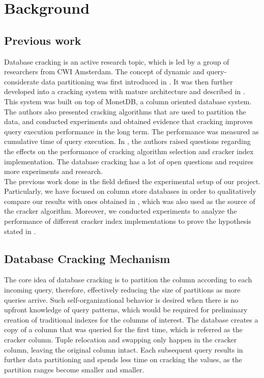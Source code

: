 \section{Background}
\label{sec:background}
\subsection{Previous work}
Database cracking is an active research topic, which is led by a group of researchers from CWI Amsterdam. The concept of dynamic and query-considerate data partitioning was first introduced in \cite{kersten_2005}. It was then further developed into a cracking system with mature architecture and described in \cite{idreos_2007}. This system was built on top of MonetDB, a column oriented database system. The authors also presented cracking algorithms that are used to partition the data, and conducted experiments and obtained evidence that cracking improves query execution performance in the long term. The performance was measured as cumulative time of query execution. In \cite{schuhknecht_2014}, the authors raised questions regarding the effects on the performance of cracking algorithm selection and cracker index implementation. The database cracking has a lot of open questions and requires more experiments and research.\\
The previous work done in the field defined the experimental setup of our project. Particularly, we have focused on column store databases in order to qualitatively compare our results with ones obtained in \cite{idreos_2007}, which was also used as the source of the cracker algorithm. Moreover, we conducted experiments to analyze the performance of different cracker index implementations to prove the hypothesis stated in \cite{schuhknecht_2014}.

\subsection{Database Cracking Mechanism}
The core idea of database cracking is to partition the column according to each incoming query, therefore, effectively reducing the size of partitions as more queries arrive. Such self-organizational behavior is desired when there is no upfront knowledge of query patterns, which would be required for preliminary creation of traditional indexes for the columns of interest. The database creates a copy of a column that was queried for the first time, which is referred as the cracker column. Tuple relocation and swapping only happen in the cracker column, leaving the original column intact. Each subsequent query results in further data partitioning and spends less time on cracking the values, as the partition ranges become smaller and smaller.


